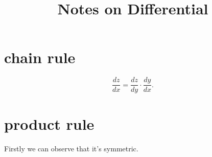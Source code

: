 \documentclass{article}
\title{Notes on Differential}
\begin{document}
\maketitle
\section{chain rule}

\begin{equation}
    \frac{dz}{dx} = \frac{dz}{dy} \cdot \frac{dy}{dx}.
\end{equation}


\section{product rule}
Firstly we can observe that it's symmetric.
\end{document}
